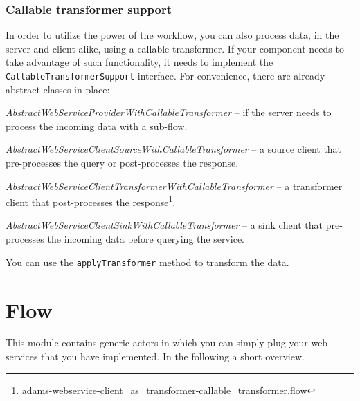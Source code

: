 \documentclass[a4paper]{book}
\begin{document}
\subsection{Callable transformer support}
\label{webservice_callable_transformer}
In order to utilize the power of the workflow, you can also process data,
in the server and client alike, using a callable transformer.
If your component needs to take advantage of such functionality, it needs to
implement the \texttt{CallableTransformerSupport} interface. For convenience,
there are already abstract classes in place:
\begin{tight_itemize}
	\item \textit{AbstractWebServiceProviderWithCallableTransformer} -- if the server needs
	to process the incoming data with a sub-flow.
	\item \textit{AbstractWebServiceClientSourceWithCallableTransformer} -- a 
	source client that pre-processes the query or post-processes the response.
	\item \textit{AbstractWebServiceClientTransformerWithCallableTransformer} --
	a transformer client that post-processes the 
	response\footnote{adams-webservice-client\_as\_transformer-callable\_transformer.flow}.
	\item \textit{AbstractWebServiceClientSinkWithCallableTransformer} -- a
	sink client that pre-processes the incoming data before querying the service.
\end{tight_itemize}
You can use the \texttt{applyTransformer} method to transform the data.

\chapter{Flow}
This module contains generic actors in which you can simply plug your 
web-services that you have implemented. In the following a short overview.
\end{document}
